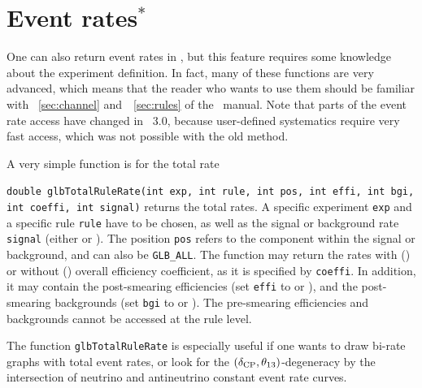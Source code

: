 \section{Event rates$^*$}
\label{sec:event_rates}
One can also return event rates in \GLOBES , but this feature
requires some knowledge about the experiment definition. 
In fact, many of these functions are very advanced, which means
that the reader who wants to use them should be familiar with
\Secs~\ref{sec:channel} and~\Sec~\ref{sec:rules} of the \AEDL\ manual.
Note that parts of the event rate access have changed in \GLOBES\ 3.0,
because user-defined systematics require very fast access, which was
not possible with the old method.

A very simple function is for the total rate
\begin{function}
{\tt double glbTotalRuleRate(int exp, int rule, int pos,
int effi, int bgi, int coeffi, int signal)} returns the total rates.
A specific experiment {\tt exp} and a 
specific rule {\tt rule} have to be chosen, as well as the signal
or background rate {\tt signal} (either  or ).
The position {\tt pos} refers to the component within the signal or 
background, and can also be {\tt GLB\_ALL}. The function may return
the rates with () or without ()
overall efficiency coefficient, as it is specified by {\tt coeffi}. 
In addition, it may contain the post-smearing efficiencies (set
{\tt effi} to  or ), and the
post-smearing backgrounds (set
{\tt bgi} to  or ). The pre-smearing
efficiencies and backgrounds cannot be accessed at the rule level.
\end{function}
The function {\tt glbTotalRuleRate} is especially useful if
one wants to draw bi-rate graphs with total event rates, or look
for the $(\delta_{\mathrm{CP}},\theta_{13})$-degeneracy by the intersection of 
neutrino and antineutrino constant event rate curves.

